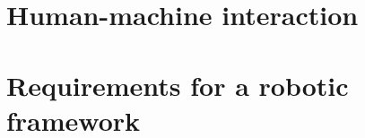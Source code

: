 \documentclass[%
oneside,    %
project,    %
nosummary   %
]{USN-MSc}
\begin{document}
\section{Human-machine interaction}

\section{Requirements for a robotic framework}



~\nocite{*}

\cleardoublepage

\printbibliography[heading=bibintoc, title={References}]




%
%
%
%
%
%
\end{document}
